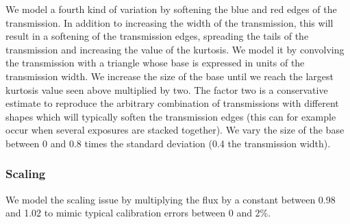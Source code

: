 \documentclass[11pt]{article}
\begin{document}
We model a fourth kind of variation by softening the blue and red edges
of the transmission. In addition to increasing the width of the
transmission, this will result in a softening of the transmission edges,
spreading the tails of the transmission and increasing the value of the
kurtosis. We model it by convolving the transmission with a triangle
whose base is expressed in units of the transmission width. We increase
the size of the base until we reach the largest kurtosis value seen
above multiplied by two. The factor two is a conservative estimate to
reproduce the arbitrary combination of transmissions with different
shapes which will typically soften the transmission edges (this can for
example occur when several exposures are stacked together). We vary the
size of the base between 0 and 0.8 times the standard deviation (0.4 the
transmission width).

\subsubsection{Scaling}\label{scaling}

We model the scaling issue by multiplying the flux by a constant between
0.98 and 1.02 to mimic typical calibration errors between 0 and 2\%.
\end{document}
